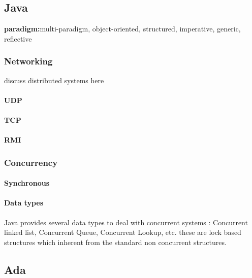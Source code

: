 \documentclass[a4paper,oneside]{article}
\begin{document}
	\subsection{Java}
	
		\textbf{paradigm:}multi-paradigm, object-oriented, structured, imperative, generic, reflective

		\subsubsection{Networking}
			discuss distributed systems here
			\paragraph{UDP}
 

			\paragraph{TCP}

			\paragraph{RMI}


		\subsubsection{Concurrency}

			\paragraph{Synchronous}

			\paragraph{Data types}
				Java provides several data types to deal with concurrent systems : Concurrent linked list, Concurrent Queue, Concurrent Lookup, etc. these are lock based structures which inherent from the standard non concurrent structures. 
			

		\subsubsection{}

	\subsection{Ada}
\end{document}

